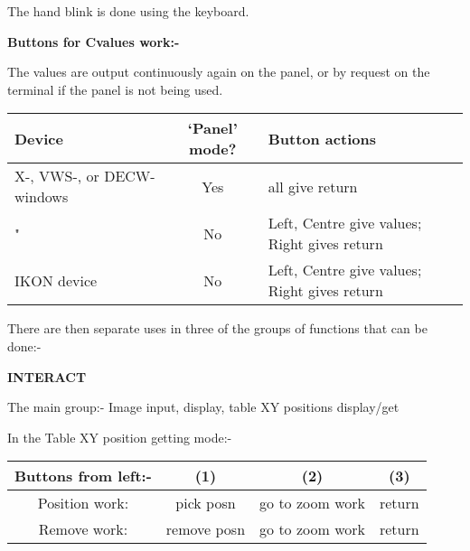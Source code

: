 {{The hand blink is done using the keyboard.
                                                                               
{\bf \hspace*{4ex}      Buttons for Cvalues work:- }

The values are output continuously again on the panel, or by
request on the terminal if the panel is not being used.

\hspace*{4ex}\begin{tabular}{|p{2in}|c|l|} \hline
         Device      &`Panel' mode?  &  Button actions \\ \hline
X-, VWS-, or DECW- windows &  Yes  &          all give return \\
     \hspace*{6ex}        "       &   No       &     Left, Centre give values;
                                        Right gives return \\
       IKON device   &   No        &    Left, Centre give values;
                                        Right gives return \\ \hline
\end{tabular}                                                                               
                                                                               
  There are then separate uses in three of the groups of functions
  that can be done:-
                                                                               
                                                                               
{\bf \hspace*{4ex}      INTERACT }
                                                                               
      The main group:- Image input, display, table XY positions
                       display/get
                                                                               
      In the Table XY position getting mode:-
                                                                               
                                                                               
\hspace*{4ex}\begin{tabular}{|c|c|c|c|}\hline
      Buttons from left:- &   (1)    &       (2)   & (3) \\ \hline
        Position work: &  pick posn   &  go to zoom work & return \\
          Remove work:& remove posn &    go to zoom work & return \\ \hline
\end{tabular}
                                                                               
}}
